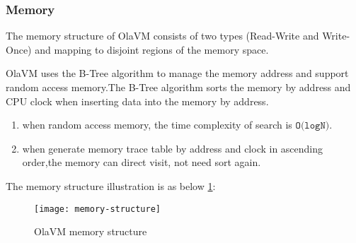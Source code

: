 \subsubsection{Memory}\label{subsec: ola-memory}
The memory structure of OlaVM consists of two types (Read-Write and Write-Once) and mapping to disjoint regions of the memory space.
\begin{table}[!ht]
    \centering {}
    \caption{Memory segment range}
    \label{table:memory-segment-range}
\end{table}


OlaVM uses the B-Tree algorithm to manage the memory address and support random access memory.The B-Tree algorithm sorts the memory by address and CPU clock when inserting data into the memory by address.
\begin{enumerate}
    \item when random access memory, the time complexity of search is $\texttt{O(logN)}$.
    \item when generate memory trace table by address and clock in ascending order,the memory can direct visit, not need sort again.
\end{enumerate}

The memory structure illustration is as below \ref{fig: B-tree-memory}:
\begin{figure}[!htp]
    \centering
    \texttt{[image: memory-structure]}
    \caption{OlaVM memory structure}
    \label{fig: B-tree-memory}
\end{figure}
